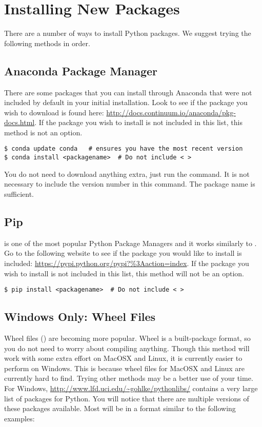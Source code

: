 \label{updateinstall}


\section*{Installing New Packages}
There are a number of ways to install Python packages. We suggest trying the following methods in order.

\subsection*{Anaconda Package Manager}
There are some packages that you can install through Anaconda that were not included by default in your initial installation.  
Look to see if the package you wish to download is found here: \url{http://docs.continuum.io/anaconda/pkg-docs.html}. If the package you wish to install is not included in this list, this method is not an option.
 
\begin{lstlisting}
$ conda update conda   # ensures you have the most recent version
$ conda install <packagename>  # Do not include < >
\end{lstlisting} 
You do not need to download anything extra, just run the command. It is not necessary to include the version number in this command. The package name is sufficient.


\subsection*{Pip}
 is one of the most popular Python Package Managers and it works similarly to . Go to the following website to see if the package you would like to install is included: \url{https://pypi.python.org/pypi?\%3Aaction=index}. If the package you wish to install is not included in this list, this method will not be an option.

\begin{lstlisting}
$ pip install <packagename>  # Do not include < >
\end{lstlisting}

\subsection*{Windows Only: Wheel Files}
Wheel files () are becoming more popular. Wheel is a built-package format, so you do not need to worry about compiling anything. Though this method will work with some extra effort on MacOSX and Linux, it is currently easier to perform on Windows. This is because wheel files for MacOSX and Linux are currently hard to find. Trying other methods may be a better use of your time. For Windows, \url{http://www.lfd.uci.edu/~gohlke/pythonlibs/} contains a very large list of packages for Python. You will notice that there are multiple versions of these packages available. Most will be in a format similar to the following examples:

